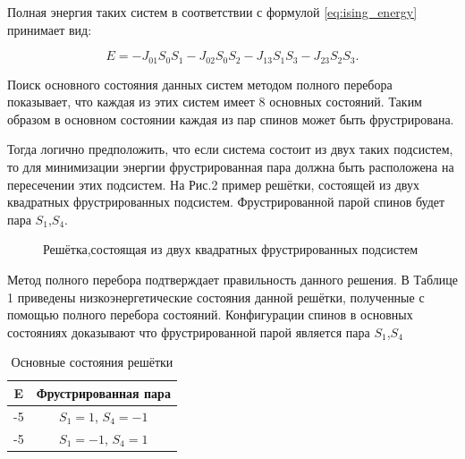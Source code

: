 \documentclass[utf8, babel, sor, jor, amsmath, amssymb, reprint]{elsarticle} %
\begin{document}
Полная энергия таких систем в соответствии с формулой \eqref{eq:ising_energy} принимает вид:

\begin{equation}
	E = -J_{01} S_0 S_1-J_{02} S_0 S_2-J_{13} S_1 S_3-J_{23} S_2 S_3.
	\label{eq:ising_energy_2x2}
\end{equation}

Поиск основного состояния данных систем методом полного перебора показывает, что каждая из этих систем имеет 8 основных состояний. Таким образом в основном состоянии каждая из пар спинов может быть фрустрирована.

Тогда логично предположить, что если система состоит из двух таких подсистем, то для минимизации энергии фрустрированная пара должна быть расположена на пересечении этих подсистем.
На Рис.2 пример решётки, состоящей из двух квадратных фрустрированных подсистем. Фрустрированной парой спинов будет пара $S_1$,$S_4$.

\begin{figure}[h]
	\centering
	\caption{Решётка,состоящая из двух квадратных фрустрированных подсистем}
	\label{fig:label}
\end{figure}


Метод полного перебора подтверждает правильность данного решения. В Таблице 1 приведены низкоэнергетические состояния данной решётки, полученные с помощью полного перебора состояний. Конфигурации спинов в основных состояниях доказывают что фрустрированной парой является пара $S_1$,$S_4$

\begin{table}[h]
	\centering
	\begin{tabular}{|c|c|}
		\hline
		 E   &   Фрустрированная пара \\
		 \hline
		-5   &  $S_1=1$, $S_4=-1$ \\
		\hline
		-5   &   $S_1=-1$, $S_4=1$ \\
		\hline
	\end{tabular}
	\caption{Основные состояния решётки}
	\label{tab:gs}
\end{table}
\end{document}
